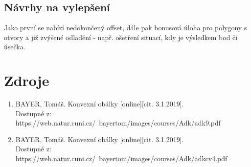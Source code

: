 \documentclass[a4paper, 12pt]{article}
\begin{document}
\subsection{Návrhy na vylepšení}
Jako první se nabízí nedokončený offset, dále pak bonusová úloha pro polygony s otvory a již zvýšené odladění - např. ošetření situací, kdy je výsledkem bod či úsečka.


\clearpage
\section{Zdroje}

\begin{enumerate}
\item  BAYER, Tomáš. Konvexní obálky [online][cit. 3.1.2019]. \\
Dostupné z: https://web.natur.cuni.cz/~bayertom/images/courses/Adk/adk9.pdf  \\

\item  BAYER, Tomáš. Konvexní obálky [online][cit. 3.1.2019]. \\
Dostupné z: https://web.natur.cuni.cz/~bayertom/images/courses/Adk/adkcv4.pdf\\
\end{enumerate}
\end{document}
